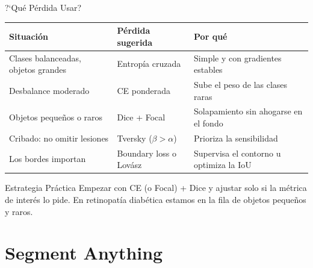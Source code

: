 \documentclass[aspectratio=169, 10pt]{beamer}
\begin{document}
\begin{frame}{?`Qu\'e P\'erdida Usar?}

	\vspace{0.3cm}

	\begin{center}
		\begin{tabular}{>{\raggedright\arraybackslash}p{4.2cm} >{\raggedright\arraybackslash}p{3.6cm} >{\raggedright\arraybackslash}p{5.2cm}}
			\toprule
			\textbf{Situaci\'on} & \textbf{P\'erdida sugerida} & \textbf{Por qu\'e} \\
			\midrule
			Clases balanceadas, objetos grandes & Entrop\'ia cruzada & Simple y con gradientes estables \\
			Desbalance moderado & CE ponderada & Sube el peso de las clases raras \\
			Objetos peque\~nos o raros & Dice + Focal & Solapamiento sin ahogarse en el fondo \\
			Cribado: no omitir lesiones & Tversky ($\beta > \alpha$) & Prioriza la sensibilidad \\
			Los bordes importan & Boundary loss o Lov\'asz & Supervisa el contorno u optimiza la IoU \\
			\bottomrule
		\end{tabular}
	\end{center}

	\vspace{0.3cm}

	\begin{alertblock}{Estrategia Pr\'actica}
		Empezar con CE (o Focal) + Dice y ajustar solo si la m\'etrica de inter\'es lo pide. En retinopat\'ia diab\'etica estamos en la fila de objetos peque\~nos y raros.
	\end{alertblock}

\end{frame}

\section{Segment Anything}
\end{document}
